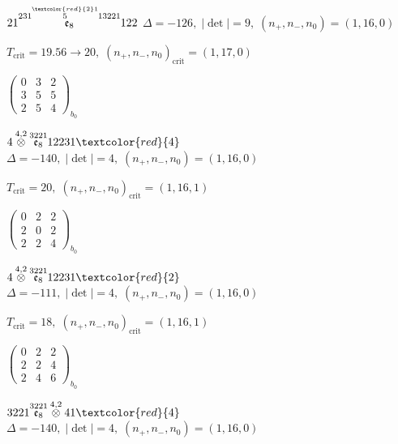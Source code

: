 \documentclass[10pt]{article}
\begin{document}
\smallskip

$21\overset{231\overset{\textcolor{red}{2}1}{5}13221}{\mathfrak{e}_8}122$ \quad $\Delta=-126,\; |\det|=9,\; (n_+,n_-,n_0)=(1,16,0)$

\hspace{1em}$T_{\text{crit}}=19.56 \to 20,\; (n_+,n_-,n_0)_{\text{crit}}=(1,17,0)$

\hspace{2em}$\left(\begin{smallmatrix}0 & 3 & 2 \\ 3 & 5 & 5 \\ 2 & 5 & 4\end{smallmatrix}\right)_{\!b_0}$

\smallskip

$4\overset{4,2}{\otimes}\overset{3221}{\mathfrak{e}_8}12231\textcolor{red}{4}$ \quad $\Delta=-140,\; |\det|=4,\; (n_+,n_-,n_0)=(1,16,0)$

\hspace{1em}$T_{\text{crit}}=20,\; (n_+,n_-,n_0)_{\text{crit}}=(1,16,1)$

\hspace{2em}$\left(\begin{smallmatrix}0 & 2 & 2 \\ 2 & 0 & 2 \\ 2 & 2 & 4\end{smallmatrix}\right)_{\!b_0}$

$4\overset{4,2}{\otimes}\overset{3221}{\mathfrak{e}_8}12231\textcolor{red}{2}$ \quad $\Delta=-111,\; |\det|=4,\; (n_+,n_-,n_0)=(1,16,0)$

\hspace{1em}$T_{\text{crit}}=18,\; (n_+,n_-,n_0)_{\text{crit}}=(1,16,1)$

\hspace{2em}$\left(\begin{smallmatrix}0 & 2 & 2 \\ 2 & 2 & 4 \\ 2 & 4 & 6\end{smallmatrix}\right)_{\!b_0}$

\smallskip

$3221\overset{3221}{\mathfrak{e}_8}\overset{4,2}{\otimes}41\textcolor{red}{4}$ \quad $\Delta=-140,\; |\det|=4,\; (n_+,n_-,n_0)=(1,16,0)$
\end{document}
